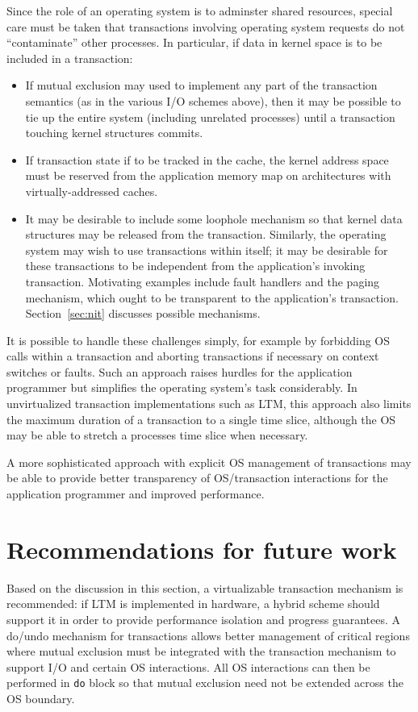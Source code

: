 Since the role of an operating system is to adminster shared
resources, special care must be taken that transactions involving
operating system requests do not ``contaminate'' other processes.
In particular, if data in kernel space is to be included in a
transaction:
\begin{itemize}
\item If mutual exclusion may used to implement any part of the
transaction semantics (as in the various I/O schemes above), then it
may be possible to tie up the entire system (including unrelated
processes) until a transaction touching kernel structures commits.
\item If transaction state if to be tracked in the cache, the
kernel address space must be reserved from the application memory map
 on architectures with virtually-addressed caches.
\item It may be desirable to include some loophole mechanism
 so that kernel data structures may be released from the transaction.
 Similarly, the operating system may wish to use transactions within
 itself; it may be desirable for these transactions to be independent
 from the application's invoking transaction.  Motivating examples
 include fault handlers and the paging mechanism, which ought to be
 transparent to the application's transaction.  Section~\ref{sec:nit}
 discusses possible mechanisms.
\end{itemize}

It is possible to handle these challenges simply, for example by
forbidding OS calls within a transaction and aborting transactions if
necessary on context switches or faults.  Such an approach raises
hurdles for the application programmer but simplifies the operating
system's task considerably.  In unvirtualized transaction
implementations such as LTM, this approach also limits the maximum
duration of a transaction to a single time slice, although the OS may
be able to stretch a processes time slice when necessary.

A more sophisticated approach with explicit OS management of
transactions may be able to provide better transparency of
OS/transaction interactions for the application programmer and
improved performance.

\section{Recommendations for future work}
Based on the discussion in this section, a virtualizable transaction
mechanism is recommended: if LTM is implemented in hardware, a hybrid
scheme should support it in order to provide performance isolation and
progress guarantees.  A do/undo mechanism for transactions allows
better management of critical regions where mutual exclusion must be
integrated with the transaction mechanism to support I/O and certain
OS interactions.  All OS interactions can then be performed in
\texttt{do} block so that mutual exclusion need not be extended across
the OS boundary.

